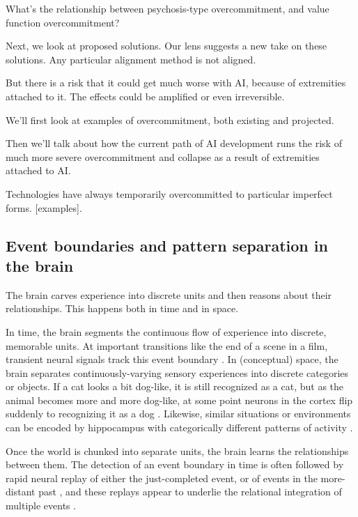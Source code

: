 What's the relationship between psychosis-type overcommitment, and value function overcommitment?

Next, we look at proposed solutions. Our lens suggests a new take on these solutions. Any particular alignment method is not aligned. 

But there is a risk that it could get much worse with AI, because of extremities attached to it. The effects could be amplified or even irreversible. 

We'll first look at examples of overcommitment, both existing and projected.

Then we'll talk about how the current path of AI development runs the risk of much more severe overcommitment and collapse as a result of extremities attached to AI. 

Technologies have always temporarily overcommitted to particular imperfect forms. [examples].  


\subsection{Event boundaries and pattern separation in the brain}

The brain carves experience into discrete units and then reasons about their relationships. This happens both in time and in space. 

In time, the brain segments the continuous flow of experience into discrete, memorable units. At important transitions like the end of a scene in a film, transient neural signals track this event boundary \citep{zacks2001human, zacks2010brain, speer2007human, baldassano2017discovering}. In (conceptual) space, the brain separates continuously-varying sensory experiences into discrete categories or objects. If a cat looks a bit dog-like, it is still recognized as a cat, but as the animal becomes more and more dog-like, at some point neurons in the cortex flip suddenly to recognizing it as a dog \citep{freedman2006experience}. Likewise, similar situations or environments can be encoded by hippocampus with categorically different patterns of activity \citep{leutgeb2007pattern, bakker2008pattern, yassa2011pattern}.

Once the world is chunked into separate units, the brain learns the relationships between them. The detection of an event boundary in time is often followed by rapid neural replay of either the just-completed event, or of events in the more-distant past \citep{ben2013hippocampal, ben2011constructing, kurby2008segmentation, silva2019rapid, hahamy2023human}, and these replays appear to underlie the relational integration of multiple events \citep{hahamy2023human, liu2022hippocampal}. 

